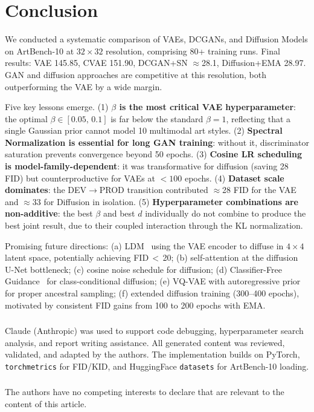 \documentclass[runningheads]{llncs}
\begin{document}
\section{Conclusion}\label{sec:conclusion}

We conducted a systematic comparison of VAEs, DCGANs, and Diffusion Models on ArtBench-10 at $32{\times}32$ resolution, comprising 80+ training runs. Final results: VAE 145.85, CVAE 151.90, DCGAN+SN $\approx$28.1, Diffusion+EMA 28.97. GAN and diffusion approaches are competitive at this resolution, both outperforming the VAE by a wide margin.

Five key lessons emerge. (1) \textbf{$\beta$ is the most critical VAE hyperparameter}: the optimal $\beta \in [0.05,\,0.1]$ is far below the standard $\beta=1$, reflecting that a single Gaussian prior cannot model 10 multimodal art styles. (2) \textbf{Spectral Normalization is essential for long GAN training}: without it, discriminator saturation prevents convergence beyond 50 epochs. (3) \textbf{Cosine LR scheduling is model-family-dependent}: it was transformative for diffusion (saving 28 FID) but counterproductive for VAEs at $<100$ epochs. (4) \textbf{Dataset scale dominates}: the DEV$\to$PROD transition contributed $\approx$28 FID for the VAE and $\approx$33 for Diffusion in isolation. (5) \textbf{Hyperparameter combinations are non-additive}: the best $\beta$ and best $d$ individually do not combine to produce the best joint result, due to their coupled interaction through the KL normalization.

Promising future directions: (a) LDM~\cite{rombach2022} using the VAE encoder to diffuse in $4{\times}4$ latent space, potentially achieving FID\,$<$\,20; (b) self-attention at the diffusion U-Net bottleneck; (c) cosine noise schedule for diffusion; (d) Classifier-Free Guidance~\cite{ho2020} for class-conditional diffusion; (e) VQ-VAE with autoregressive prior~\cite{oord2017} for proper ancestral sampling; (f) extended diffusion training (300--400 epochs), motivated by consistent FID gains from 100 to 200 epochs with EMA.

\begin{credits}
\subsubsection{\ackname}
Claude (Anthropic) was used to support code debugging, hyperparameter search analysis, and report writing assistance. All generated content was reviewed, validated, and adapted by the authors. The implementation builds on PyTorch, \texttt{torchmetrics} for FID/KID, and HuggingFace \texttt{datasets} for ArtBench-10 loading.

\subsubsection{\discintname}
The authors have no competing interests to declare that are relevant to the content of this article.
\end{credits}
\end{document}
